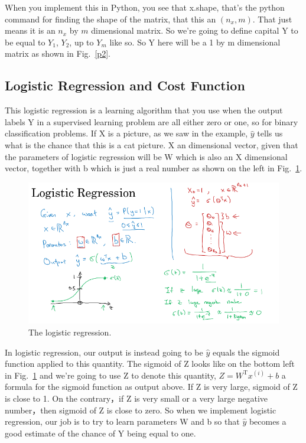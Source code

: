 \documentclass[a4paper]{article}
\begin{document}
When you implement this in Python, you see that x.shape, that's the python command for finding the shape of the matrix, that this an $(n_x, m)$. That just means it is an $n_x$ by $m$ dimensional matrix. So we're going to define capital Y to be equal to $Y_1$, $Y_2$, up to $Y_m$ like so. So Y here will be a 1 by m dimensional matrix as shown in Fig.~\ref{p2}.

\subsection{Logistic Regression and Cost Function}

This logistic regression is a learning algorithm that you use when the output labels Y in a supervised learning problem are all either zero or one, so for binary classification problems. If X is a picture, as we saw in the example, $\hat{y}$ tells us what is the chance that this is a cat picture. X an dimensional vector, given that the parameters of logistic regression will be W which is also an X dimensional vector, together with b which is just a real number as shown on the left in Fig.~\ref{p3}.
\begin{figure}
	\begin{center}
		\includegraphics[scale=0.4]{figures/4.png}
	\end{center}
	\caption{The logistic regression.}
	\label{p3}
\end{figure}

In logistic regression, our output is instead going to be $\hat{y}$ equals the sigmoid function applied to this quantity. The sigmoid of Z looks like on the bottom left in Fig.~\ref{p3} and we're going to use Z to denote this quantity, $Z=W^\mathrm{T}x^{(i)}+b$ a formula for the sigmoid function as output above. If Z is very large, sigmoid of Z is close to 1. On the contrary，if Z is very small or a very large negative number，then sigmoid of Z is close to zero. So when we implement logistic regression, our job is to try to learn parameters W and b so that $\hat{y}$ becomes a good estimate of the chance of Y being equal to one.
\end{document}
